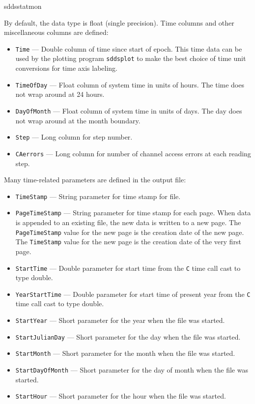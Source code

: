 \begin{sddsprog}{sddsstatmon}
\begin{itemize}
By default, the data type is float (single precision). 
Time columns and other miscellaneous columns are defined: 
\begin{itemize}
        \item {\tt Time} --- Double column of time since start of epoch. This time data can be used by
        the plotting program {\verb+sddsplot+} to make the best choice of time unit conversions
        for time axis labeling.
        \item {\tt TimeOfDay} --- Float column of system time in units of hours. 
        The time does not wrap around at 24 hours.
        \item {\tt DayOfMonth} --- Float column of system time in units of days. 
        The day does not wrap around at the month boundary.
        \item {\tt Step} --- Long column for step number.
        \item {\tt CAerrors} --- Long column for number of channel access errors at each reading step. 
\end{itemize}

Many time-related parameters are defined in the output file:
\begin{itemize}
        \item {\tt TimeStamp} --- String parameter for time stamp for file.
        \item {\tt PageTimeStamp} --- String parameter for time stamp for each page. When data
                is appended to an existing file, the new data is written to a new
                page. The {\tt PageTimeStamp} value for the new page is the creation
                date of the new page. The {\tt TimeStamp} value for the new page is the creation 
                date of the very first page.
        \item {\tt StartTime} --- Double parameter for start time from the {\tt C} time call cast to type double.
        \item {\tt YearStartTime} --- Double parameter for start time of present year from the {\tt C} time call cast to type double.
        \item {\verb+StartYear+} --- Short parameter for the year when the file was started.
        \item {\verb+StartJulianDay+} --- Short parameter for the day when the file was started.
        \item {\verb+StartMonth+} --- Short parameter for the month when the file was started.
        \item {\verb+StartDayOfMonth+} --- Short parameter for the day of month when the file was started.
        \item {\verb+StartHour+} --- Short parameter for the hour when the file was started.
\end{itemize}
\end{itemize} %



\end{sddsprog}
